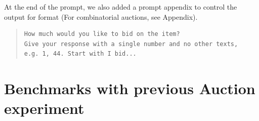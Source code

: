\documentclass{article} %
\begin{document}
At the end of the prompt, we also added a prompt appendix to control the output for format (For combinatorial auctions, see Appendix).

\begin{quote}
\begin{lstlisting}[basicstyle=\ttfamily]
How much would you like to bid on the item? 
Give your response with a single number and no other texts,
e.g. 1, 44. Start with I bid...
\end{lstlisting}
\end{quote}







\section{Benchmarks with previous Auction experiment}\label{results}


\end{document}
